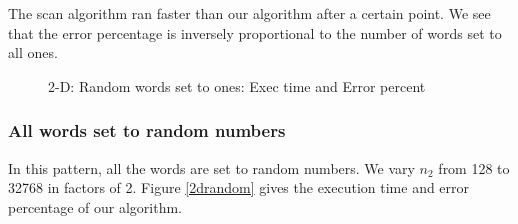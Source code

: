 \documentclass{article}
\begin{document}
The scan algorithm ran faster than our algorithm after a certain point. We see that the error percentage is inversely proportional to the number of words set to all ones.
\begin{figure}
\mbox{}
\caption{2-D: Random words set to ones: Exec time and Error percent} \label{2drandones}
\end{figure}

\subsubsection{All words set to random numbers}
In this pattern, all the words are set to random numbers. We vary $n_2$ from 128 to 32768 in factors of 2. Figure \ref{2drandom} gives the execution time and error percentage of our algorithm. 
\end{document}
